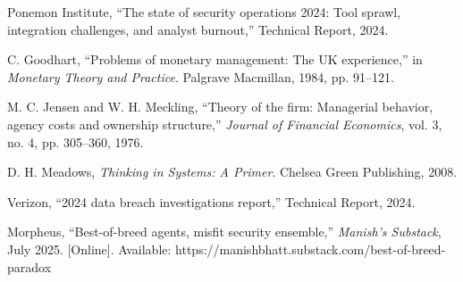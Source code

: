 \documentclass[10pt,conference]{IEEEtran}
\begin{document}
\begin{thebibliography}{10}
Ponemon Institute, ``The state of security operations 2024: Tool sprawl, integration challenges, and analyst burnout,'' Technical Report, 2024.

C. Goodhart, ``Problems of monetary management: The UK experience,'' in \textit{Monetary Theory and Practice}. Palgrave Macmillan, 1984, pp. 91--121.

M. C. Jensen and W. H. Meckling, ``Theory of the firm: Managerial behavior, agency costs and ownership structure,'' \textit{Journal of Financial Economics}, vol. 3, no. 4, pp. 305--360, 1976.

D. H. Meadows, \textit{Thinking in Systems: A Primer}. Chelsea Green Publishing, 2008.

Verizon, ``2024 data breach investigations report,'' Technical Report, 2024.

Morpheus, ``Best-of-breed agents, misfit security ensemble,'' \textit{Manish's Substack}, July 2025. [Online]. Available: https://manishbhatt.substack.com/best-of-breed-paradox

\end{thebibliography}
\end{document}
